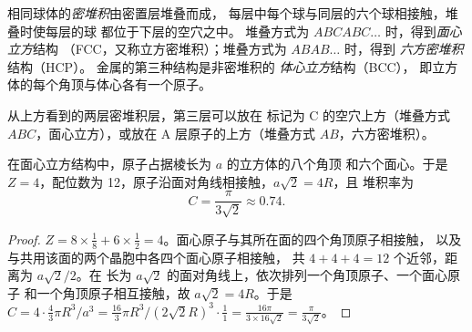 \begin{definition}\label{def:b1:crystals-metals:packings}
相同球体的\emph{密堆积}由密置层堆叠而成，
每层中每个球与同层的六个球相接触，堆叠时使每层的球
都位于下层的空穴之中。
堆叠方式为 $ABCABC\dots$ 时，得到\emph{面心立方}结构
（FCC，又称立方密堆积）；堆叠方式为 $ABAB\dots$ 时，得到
\emph{六方密堆积}结构（HCP）。
金属的第三种结构是非密堆积的
\emph{体心立方}结构（BCC），
即立方体的每个角顶与体心各有一个原子。
\end{definition}

\begin{omfigure}

{\small 从上方看到的两层密堆积层，第三层可以放在
标记为 C 的空穴上方（堆叠方式 $ABC$，面心立方），或放在
A 层原子的上方（堆叠方式 $AB$，六方密堆积）。}
\end{omfigure}

\begin{proposition}[面心立方]\label{prop:b1:crystals-metals:fcc}
在面心立方结构中，原子占据棱长为 $a$ 的立方体的八个角顶
和六个面心。于是 $Z = 4$，配位数为
12，原子沿面对角线相接触，$a\sqrt2 = 4R$，且
堆积率为
\[
  C = \frac{\pi}{3\sqrt2} \approx 0.74 .
\]
\end{proposition}

\begin{proof}
$Z = 8 \times \frac18 + 6 \times \frac12 = 4$。面心原子与其所在面的四个角顶原子相接触，
以及与共用该面的两个晶胞中各四个面心原子相接触，
共 $4 + 4 + 4 = 12$ 个近邻，距离为 $a\sqrt2/2$。在
长为 $a\sqrt2$ 的面对角线上，依次排列一个角顶原子、一个面心原子
和一个角顶原子相互接触，故 $a\sqrt2 = 4R$。于是
$C = 4 \cdot \frac43\pi R^3/a^3 = \frac{16}{3}\pi R^3/(2\sqrt2 R)^3 \cdot
\frac{1}{1} = \frac{16\pi}{3 \times 16\sqrt2} = \frac{\pi}{3\sqrt2}$。
\end{proof}

